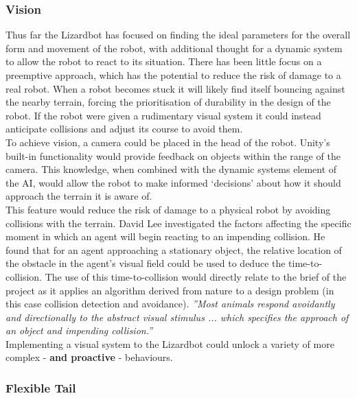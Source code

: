 \documentclass{article}
\begin{document}
\subsubsection{Vision}
Thus far the Lizardbot has focused on finding the ideal parameters for the overall form and movement of the robot, with additional thought for a dynamic system to allow the robot to react to its situation. There has been little focus on a preemptive approach, which has the potential to reduce the risk of damage to a real robot. When a robot becomes stuck it will likely find itself bouncing against the nearby terrain, forcing the prioritisation of durability in the design of the robot. If the robot were given a rudimentary visual system it could instead anticipate collisions and adjust its course to avoid them.\\
To achieve vision, a camera could be placed in the head of the robot. Unity’s built-in functionality would provide feedback on objects within the range of the camera. This knowledge, when combined with the dynamic systems element of the AI, would allow the robot to make informed ‘decisions’ about how it should approach the terrain it is aware of. \\
This feature would reduce the risk of damage to a physical robot by avoiding collisions with the terrain. David Lee investigated the factors affecting the specific moment in which an agent will begin reacting to an impending collision. He found that for an agent approaching a stationary object, the relative location of the obstacle in the agent’s visual field could be used to deduce the time-to-collision.  The use of this time-to-collision would directly relate to the brief of the project as it applies an algorithm derived from nature to a design problem (in this case collision detection and avoidance). \textit{”Most animals respond avoidantly and directionally to the abstract visual stimulus ... which specifies the approach of an object and impending collision.”} \\
Implementing a visual system to the Lizardbot could unlock a variety of more complex - \textbf{and proactive} - behaviours.
\subsubsection{Flexible Tail}

\newpage
\end{document}
